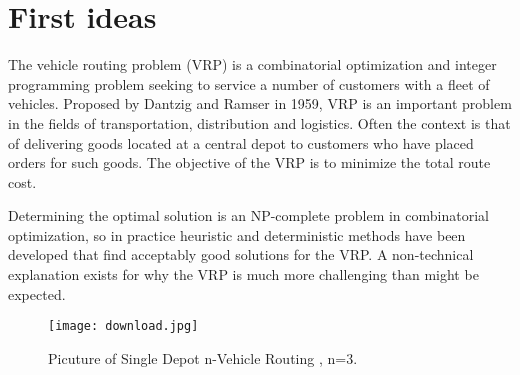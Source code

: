 \documentclass[11pt,fleqn]{book} %
\begin{document}
\section{First ideas}

  The vehicle routing problem (VRP) is a combinatorial optimization and integer programming problem seeking to service a number of customers with a fleet of vehicles. Proposed by Dantzig and Ramser in 1959, VRP is an important problem in the fields of transportation, distribution and logistics. Often the context is that of delivering goods located at a central depot to customers who have placed orders for such goods. The objective of the VRP is to minimize the total route cost.


Determining the optimal solution is an NP-complete problem in combinatorial optimization, so in practice heuristic and deterministic methods have been developed that find acceptably good solutions for the VRP. A non-technical explanation exists for why the VRP is much more challenging than might be expected.

\begin{figure}[h]
    \centering
    \texttt{[image: download.jpg]}
    \caption{Picuture of Single Depot n-Vehicle Routing , n=3. }
    \label{fig:awesome_image}
\end{figure}
\end{document}
